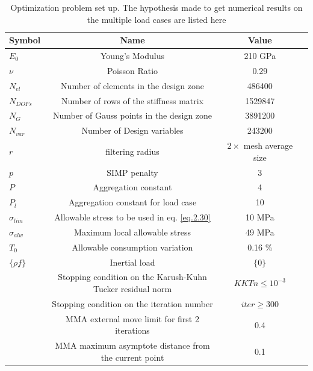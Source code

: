   \begin{table}[h]
          \caption{\label{tab:table4} Optimization problem set up. The hypothesis made to get numerical results on the multiple load cases are listed here}
           \centering
           \begin{tabular}{lccc}
           \hline
            Symbol& Name& Value\\\hline
           $E_0$ & Young's Modulus & 210 GPa\\
           $\nu$ & Poisson Ratio& 0.29&\\ $N_{el}$ & Number of elements in the design zone & 486400 \\
           $N_{DOFs}$ & Number of rows of the stiffness matrix & 1529847\\
           $N_G$ & Number of Gauss points in the design zone & 3891200\\
           $N_{var}$ & Number of Design variables & 243200\\
  		$r$ & filtering radius & $2 \times$ mesh average size  \\
  		$p$ & SIMP penalty & 3\\
  		$P$ & Aggregation constant & 4\\  
  		$P_l$ & Aggregation constant for load case& 10\\ 
  		$\sigma_{lim}$ & Allowable stress to be used in eq. \eqref{eq.2.30} & 10 MPa\\
  		$\sigma_{alw}$ & Maximum local allowable stress & 49 MPa\\
  		$T_0$ & Allowable consumption variation & 0.16 \% \\
  		$\lbrace\rho f \rbrace$ & Inertial load & $\lbrace 0 \rbrace$ \\
  		 & Stopping condition on the Karush-Kuhn Tucker residual norm & $KKTn\leq10^{-3}$\\ 
  		& Stopping condition on the iteration number & $iter \geq 300$ \\
  		& MMA external move limit for first 2 iterations & 0.4 \\
  		& MMA maximum asymptote distance from the current point & 0.1 \\
           \hline
           \end{tabular}
           \end{table}
